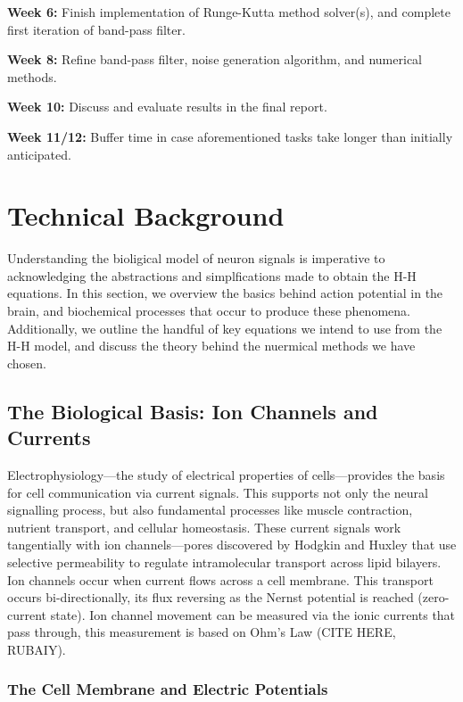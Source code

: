 \documentclass{article} %
\begin{document}
\begin{multicols}{2}
\textbf{Week 6: } Finish implementation of Runge-Kutta method solver(s), and complete first iteration of band-pass filter.

\textbf{Week 8: } Refine band-pass filter, noise generation algorithm, and numerical methods.

\textbf{Week 10: } Discuss and evaluate results in the final report.

\textbf{Week 11/12: } Buffer time in case aforementioned tasks take longer than initially anticipated.


\section{Technical Background}
\label{sec:technical_background}

Understanding the bioligical model of neuron signals is imperative to acknowledging the abstractions and simplfications made to obtain the H-H equations.
In this section, we overview the basics behind action potential in the brain, and biochemical processes that occur to produce these phenomena.
Additionally, we outline the handful of key equations we intend to use from the H-H model, and discuss the theory behind the nuermical methods we have chosen.

\subsection{The Biological Basis: Ion Channels and Currents}
\label{subsec:biological_basis}

Electrophysiology—the study of electrical properties of cells—provides the basis for cell communication via current signals. This supports not only the neural signalling process, but also fundamental processes like muscle contraction, nutrient transport, and cellular homeostasis. These current signals work tangentially with ion channels—pores discovered by Hodgkin and Huxley that use selective permeability to regulate intramolecular transport across lipid bilayers. Ion channels occur when current flows across a cell membrane. This transport occurs bi-directionally, its flux reversing as the Nernst potential is reached (zero-current state). Ion channel movement can be measured via the ionic currents that pass through, this measurement is based on Ohm's Law (CITE HERE, RUBAIY).

\subsubsection{The Cell Membrane and Electric Potentials}
\label{subsubsec:resting_potential}


\end{multicols}
\end{document}
